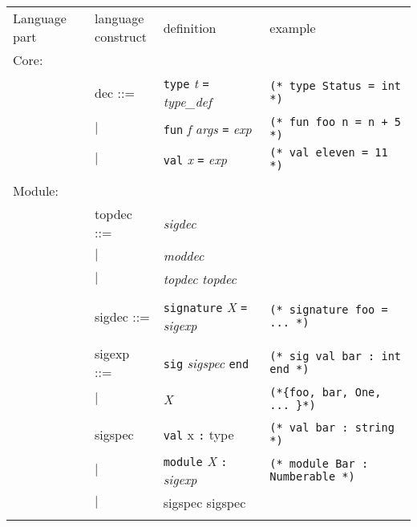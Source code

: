 \begin{tabular}{p{4em} p{7em} p{11em} p{16em}}
  \parbox[t]{4em}{Language part} & \parbox[t]{4em}{language \\construct} & definition & example \\
  Core:         &&& \\
                & dec ::= 
                  & \texttt{type} \textit{t} \texttt{=} \textit{type\_def}
                    & \texttt{(* type Status = int *)}  \\
                & $|$
                  & \texttt{fun} \textit{f} \textit{args} \texttt{=} \textit{exp}
                    & \texttt{(* fun foo n = n + 5 *)} \\
                & $|$ 
                  & \texttt{val} \textit{x} \texttt{=} \textit{exp}
                    & \texttt{(* val eleven = 11 *)} \\
                \\
Module:         &&& \\
                & topdec ::=
                  & \textit{sigdec} & \\
                & $|$
                  & \textit{moddec} & \\
                &$|$
                  & \textit{topdec} \textit{topdec} & \\
                \\
                & sigdec ::=
                  & \texttt{signature} \textit{X} \texttt{=} \textit{sigexp}
                    & \texttt{(* signature foo = ... *)} \\\\
                & sigexp ::=
                  & \texttt{sig} \textit{sigspec} \texttt{end}
                    & \texttt{(* sig val bar : int end *)} \\
                & $|$
                  & \textit{X}
                    & \texttt{(*\{foo, bar, One, ... \}*)} \\
                \\
                & sigspec
                  & \texttt{val} x \texttt{:} type
                    & \texttt{(* val bar : string *)} \\
                & $|$
                  & \texttt{module} \textit{X} \texttt{:} \textit{sigexp}
                    & \texttt{(* module Bar : Numberable *)} \\
                & $|$
                  & sigspec sigspec & \\
                \\

\end{tabular}
